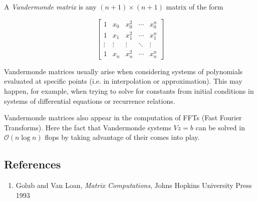 \documentclass[12pt]{article}
\begin{document}
A \emph{Vandermonde matrix} is any $(n+1)\times(n+1)$ matrix of the form 

$$ \begin{bmatrix}
 1 & x_0 & x_0^2 & \cdots & x_0^n   \\
 1 & x_1 & x_1^2 & \cdots & x_1^n   \\
 \vdots & \vdots & \vdots & \ddots & \vdots \\
 1 & x_n & x_n^2 & \cdots & x_n^n 
\end{bmatrix} $$

Vandermonde matrices usually arise when considering systems of polynomials evaluated at specific points (i.e. in interpolation or approximation).  This may happen, for example, when trying to solve for constants from initial conditions in systems of differential equations or recurrence relations.

Vandermonde matrices also appear in the computation of FFTs (Fast Fourier Transforms).  Here the fact that Vandermonde systems $Vz = b$ can be solved in $\mathcal{O}(n \log n)$ flops by taking advantage of their  comes into play.

\subsection{References}
\begin{enumerate}
\item Golub and Van Loan, \emph{Matrix Computations}, Johns Hopkins University Press 1993
\end{enumerate}
\end{document}
